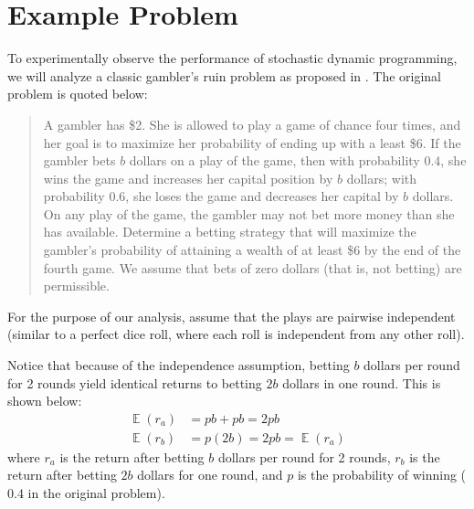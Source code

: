 \documentclass[conference]{IEEEtran}
\DeclareMathOperator*{\E}{\mathbb{E}}
\begin{document}
\section{Example Problem}

To experimentally observe the performance of stochastic dynamic programming, we will analyze a classic gambler's ruin problem as proposed in \cite{winston2004operations}. The original problem is quoted below:
\begin{quote}
A gambler has \$2. She is allowed to play a game of chance four times, and her goal is to maximize her probability of ending up with a least \$6. If the gambler bets $b$ dollars on a play of the game, then with probability $0.4$, she wins the game and increases her capital position by $b$ dollars; with probability $0.6$, she loses the game and decreases her capital by $b$ dollars. On any play of the game, the gambler may not bet more money than she has available. Determine a betting strategy that will maximize the gambler’s probability of attaining a wealth of at least \$6 by the end of the fourth game. We assume that bets of zero dollars (that is, not betting) are permissible.
\end{quote}
For the purpose of our analysis, assume that the plays are pairwise independent (similar to a perfect dice roll, where each roll is independent from any other roll).

Notice that because of the independence assumption, betting $b$ dollars per round for 2 rounds yield identical returns to betting $2b$ dollars in one round. This is shown below:
\begin{equation}
\begin{aligned}
\E(r_a) &= pb+pb = 2pb\\
\E(r_b) &= p(2b) = 2pb = \E(r_a)
\end{aligned}
\end{equation}
where $r_a$ is the return after betting $b$ dollars per round for 2 rounds, $r_b$ is the return after betting $2b$ dollars for one round, and $p$ is the probability of winning ($0.4$ in the original problem).
\end{document}
